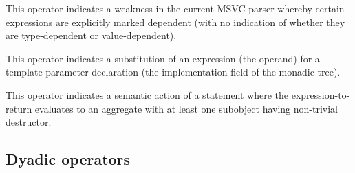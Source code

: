 This operator indicates a weakness in the current MSVC parser whereby certain expressions are explicitly
marked dependent (with no indication of whether they are type-dependent or value-dependent).

This operator indicates a substitution of an expression (the operand) for a template parameter declaration
(the implementation field of the monadic tree).

This operator indicates a semantic action of a  statement where the expression-to-return
evaluates to an aggregate with at least one subobject having non-trivial destructor.

\subsection{Dyadic operators}
\label{sec:ifc:OperatorSort:Dyadic}

